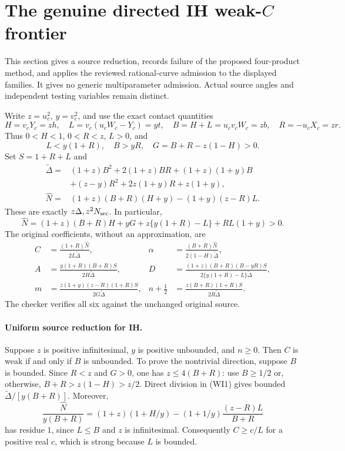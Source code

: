 \section[The genuine directed IH weak-C frontier]{The genuine directed IH weak-$C$ frontier}
\label{sec:c2-weak-ih-frontier}

This section gives a source reduction, records failure of the proposed
four-product method, and applies the reviewed rational-curve admission
to the displayed families. It gives no generic multiparameter
admission. Actual source angles and independent testing variables
remain distinct.

Write $z=u_c^2$, $y=v_c^2$, and use the exact contact quantities
\[
 H=v_cY_c=zh,\quad L=v_c(u_cW_c-Y_c)=yt,\quad
 B=H+L=u_cv_cW_c=zb,\quad R=-u_cX_c=zr.
\]
Thus $0<H<1$, $0<R<z$, $L>0$, and
\[
 L<y(1+R),\quad B>yR,\quad
 G=B+R-z(1-H)>0.
\]
Set $S=1+R+L$ and
\begin{align*}
 \widetilde\Delta={}&(1+z)B^2+2(1+z)BR+(1+z)(1+y)B\\
 &+(z-y)R^2+2z(1+y)R+z(1+y),\\
 \widehat N={}&(1+z)(B+R)(H+y)-(1+y)(z-R)L.
\end{align*}
These are exactly $z\Delta,z^2N_{\rm src}$. In particular,
\[
 \widehat N=(1+z)(B+R)H+yG+z\{y(1+R)-L\}+RL(1+y)>0.
\]
The original coefficients, without an approximation, are
\begin{align*}
 C&=\frac{(1+R)\widehat N}{2L\widetilde\Delta},&
 \alpha&=\frac{(B+R)\widehat N}{2(1-H)\widetilde\Delta},\\
 A&=\frac{y(1+R)(B+R)S}{2H\widetilde\Delta},&
 D&=\frac{(1+z)(B+R)(B-yR)S}
 {2\{y(1+R)-L\}\widetilde\Delta},\\
 m&=\frac{z(1+y)(z-R)(1+R)S}{2G\widetilde\Delta},&
 n+\frac12&=\frac{z(B+R)(1+R)S}{2R\widetilde\Delta}.
                                                        \tag{WI1}
\end{align*}
The checker verifies all six against the unchanged original source.

\paragraph{Uniform source reduction for IH.}
Suppose $z$ is positive infinitesimal, $y$ is positive unbounded,
and $n\ge0$. Then $C$ is weak if and only if $B$ is unbounded.
To prove the nontrivial direction, suppose $B$ is bounded. Since
$R<z$ and $G>0$, one has $z\le4(B+R)$: use $B\ge1/2$
or, otherwise, $B+R>z(1-H)>z/2$. Direct division in (WI1)
gives bounded $\widetilde\Delta/[y(B+R)]$. Moreover,
\[
 \frac{\widehat N}{y(B+R)}
 =(1+z)(1+H/y)
 -(1+1/y)\frac{(z-R)L}{B+R}
\]
has residue $1$, since $L\le B$ and $z$ is infinitesimal.
Consequently $C\ge c/L$ for a positive real $c$, which is strong
because $L$ is bounded.

